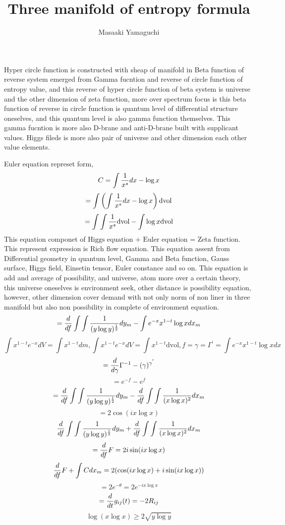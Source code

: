 \documentclass{jsarticle}
\begin{document}
{    Hyper circle function is constructed with sheap of manifold in 
    Beta function of reverse system emerged from Gamma fucntion 
    and reverse of circle function of entropy value,
    and this reverse of hyper circle function of beta system
    is universe and the other dimension of zeta function,
    more over spectrum focus is this beta function of reverse in
    circle function is quantum level of differential structure oneselves,
    and this quantum level is also gamma function themselves.
    This gamma fucntion is more also D-brane and anti-D-brane built 
    with supplicant values. Higgs fileds is more also pair of universe and
    other dimension each other value elements. 

\newpage
\title{Three manifold of entropy formula}
\author{Masaaki Yamaguchi}

  Euler equation represet form,
  $$ C = \int {1 \over x^s}dx - \log x $$
  $$ = \int \left(\int {1 \over x^s}dx - \log x \right)\mathrm{dvol} $$
  $$ = \int \int{1 \over x^s}\mathrm{dvol} - \int  \log x \mathrm{dvol} $$
  This equation componet of $ \text{Higgs equation + Euler equation =
  Zeta function} $. This represent expression is Rich flow equation.
  This equation assent from Differential geometry in quantum level,
  Gamma and Beta function, Gauss surface, Higgs field, Einsetin tensor,
  Euler constance and so on.
    This equation is add and average of possibility, and universe, atom
  more over a certain theory, this universe oneselves is environment
  seek, other distance is possibility equation, however, other dimension
  cover demand with not only norm of non liner in three manifold
  but also non possibility in complete of environment equation.
    $$ = {d \over df} \int \int{1 \over (y \log y)^{1 \over 2}}dy_m 
  - \int e^{-x}x^{1 - t} \log x dx_m $$
  $$ \int x^{1 - t}e^{-x}dV = \int x^{1 - t}dm, \int x^{1 - t}e^{-x}dV
  = \int x^{1 - t}\mathrm{dvol}, f = \gamma = \Gamma^{'} = \int 
  e^{-x}x^{1 - t} \log x dx $$
  $$ = {d \over d \gamma}\Gamma^{-1} - (\gamma)^{\gamma^{'}} $$
  $$ = e^{-f} - e^{f} $$
  $$ = {d \over df}\int \int{1 \over (y \log y)^{1 \over 2}}dy_m
  - {d \over df}\int\int {1 \over (x \log x)^2}dx_m $$
  $$ = 2 \cos (i x \log x) $$
  $$  {d \over df}\int\int{1 \over (y \log y)^{1 \over 2}}dy_m
  + {d \over df}\int\int{1 \over (x \log x)^2}dx_m $$
  $$ = {d \over df}F = 2 i \sin (i x \log x) $$
  $$ {d \over df}F + \int C dx_m  
  = 2 (\cos( i x \log x) + i \sin(i x \log x)) $$
  $$ = 2 e^{- \theta} = 2 e^{- i x \log x} $$
  $$ = {d \over dt}g_{ij}(t) = - 2 R_{ij} $$
  $$ \log (x \log x) \ge 2 \sqrt{y \log y} $$
}
\end{document}

